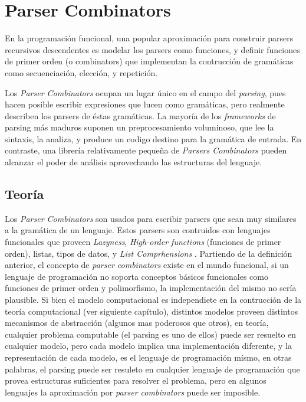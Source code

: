 
\chapter{Parser Combinators}

En la programación funcional, una popular aproximación para construir parsers recursivos descendentes es modelar los parsers como funciones, y definir funciones de primer orden (o combinators) que implementan la contrucción de gramáticas como secuenciación, elección, y repetición.\cite{Hutton1996}

Los \emph{Parser Combinators} ocupan un lugar único en el campo del \emph{parsing}, pues hacen posible escribir expresiones que lucen como gramáticas, pero realmente describen los parsers de éstas gramáticas. La mayoría de los \emph{frameworks} de parsing más maduros suponen un preprocesamiento voluminoso, que lee la sintaxis, la analiza, y produce un codigo destino para la gramática de entrada. En contraste, una librería relativamente pequeña de \emph{Parsers Combinators} pueden alcanzar el poder de análisis aprovechando las estructuras del lenguaje.\cite{Swierstra2008}



\section{Teoría}

Los \emph{Parser Combinators} son usados para escribir parsers que sean muy similares a la gramática de un lenguaje. Estos parsers son contruidos con lenguajes funcionales que proveen \emph{Lazyness}, \emph{High-order functions} (funciones de primer orden), listas, tipos de datos, y \emph{List Comprhensions} \cite{Jeuring2010}. Partiendo de la definición anterior, el concepto de \emph{parser combinators} existe en el mundo funcional, si un lenguaje de programación no soporta conceptos básicos funcionales como funciones de primer orden y polimorfismo, la implementación del mismo no sería plausible. Si bien el modelo computacional es independiete en la contrucción de la teoría computacional (ver siguiente capítulo), distintos modelos proveen distintos mecanismos de abstracción (algunos mas poderosos que otros), en teoría, cualquier problema computable (el parsing es uno de ellos) puede ser resuelto en cualquier modelo, pero cada modelo implica una implementación diferente, y la representación de cada modelo, es el lenguaje de programación mísmo, en otras palabras, el parsing puede ser resuleto en cualquier lenguaje de programación que provea estructuras suficientes para resolver el problema, pero en algunos lenguajes la aproximación por \emph{parser combinators} puede ser imposible.

